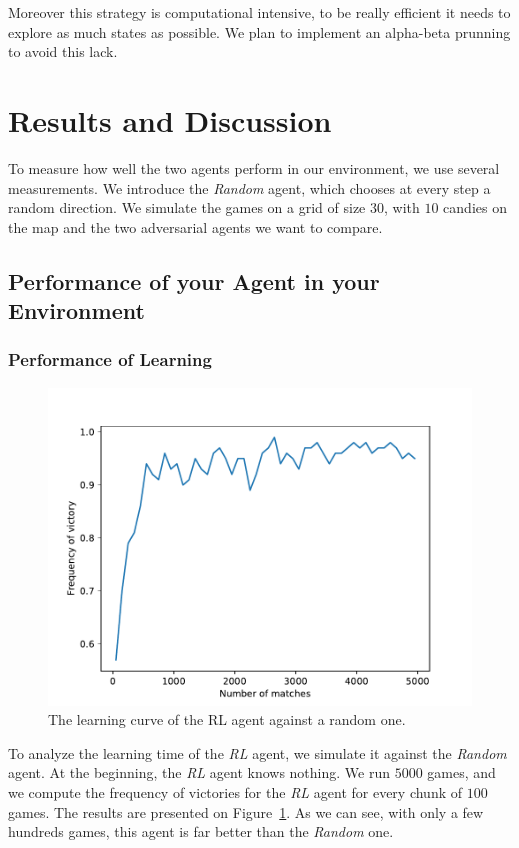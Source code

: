 \documentclass[journal, a4paper]{IEEEtran}
\begin{document}
Moreover this strategy is computational intensive, to be really efficient it needs to explore as much states as possible. We plan to implement an alpha-beta prunning to avoid this lack. 



\section{Results and Discussion}

To measure how well the two agents perform in our environment, we use several measurements.
We introduce the \emph{Random} agent, which chooses at every step a random direction.
We simulate the games on a grid of size $30$, with $10$ candies on the map and the two adversarial agents we want to compare.

\subsection{Performance of your Agent in your Environment}

\subsubsection{Performance of Learning}

\begin{figure}[h]
	\centering
    \includegraphics[width=0.95\columnwidth]{images/learning_curve_against_random.pdf}
    \caption{\label{learning_curve_against_random}The learning curve of the RL agent against a random one.}
\end{figure}

To analyze the learning time of the \emph{RL} agent, we simulate it against the \emph{Random} agent.
At the beginning, the \emph{RL} agent knows nothing.
We run $5000$ games, and we compute the frequency of victories for the \emph{RL} agent for every chunk of $100$ games.
The results are presented on Figure~\ref{learning_curve_against_random}.
As we can see, with only a few hundreds games, this agent is far better than the \emph{Random} one.
\end{document}
